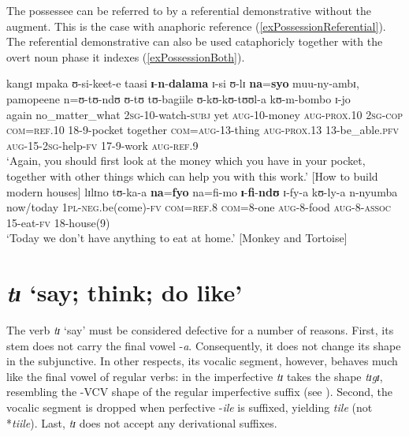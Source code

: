 The possessee can be referred to by a referential demonstrative without the augment. This is the case with anaphoric reference (\ref{exPossessionReferential}). The referential demonstrative can also be used cataphoricly together with the overt noun phase it indexes (\ref{exPossessionBoth}).
\begin{exe}
\ex \label{exPossessionReferential}\gll kangɪ mpaka ʊ-si-keet-e taasi \textbf{ɪ}-\textbf{n}-\textbf{dalama} ɪ-si ʊ-lɪ \textbf{na}=\textbf{syo} muu-ny-ambɪ, pamopeene n=ʊ-tʊ-ndʊ ʊ-tʊ tʊ-bagiile ʊ-kʊ-kʊ-tʊʊl-a kʊ-m-bombo ɪ-jo\\
again no\_matter\_what \textsc{2sg}-10-watch-\textsc{subj} yet \textsc{aug}-10-money \textsc{aug}-\textsc{prox.10} \textsc{2sg}-\textsc{cop} \textsc{com}=\textsc{ref.10} 18-9-pocket together \textsc{com}=\textsc{aug}-13-thing \textsc{aug}-\textsc{prox.13} 13-be\_able.\textsc{pfv} \textsc{aug}-15-\textsc{2sg}-help-\textsc{fv} 17-9-work \textsc{aug}-\textsc{ref.9}\\
\glt `Again, you should first look at the money which you have in your pocket, together with other things which can help you with this work.' [How to build modern houses]
\ex\label{exPossessionBoth} \gll lɪlɪno tʊ-ka-a \textbf{na}=\textbf{fyo} na=fi-mo \textbf{ɪ}-\textbf{fi}-\textbf{ndʊ} ɪ-fy-a kʊ-ly-a n-nyumba\\
now/today \textsc{1pl}-\textsc{neg}.be(come)-\textsc{fv} \textsc{com}=\textsc{ref.8} \textsc{com}=8-one \textsc{aug}-8-food \textsc{aug}-8-\textsc{assoc} 15-eat-\textsc{fv} 18-house(9)\\
\glt `Today we don't have anything to eat at home.' [Monkey and Tortoise]
\end{exe} 
\section{\textit{tɪ} `say; think; do like'}\label{defectiveti} 
The verb \textit{tɪ} \lq say' must be considered defective for a number of reasons. First, its stem does not carry the final vowel -\textit{a}. Consequently, it does not change its shape in the subjunctive. In other respects, its vocalic segment, however, behaves much like the final vowel of regular verbs: in the imperfective \textit{tɪ} takes the shape \textit{tɪgɪ}, resembling the -VCV shape of the regular imperfective suffix (see ). Second, the vocalic segment is dropped when perfective -\textit{ile} is suffixed, yielding \textit{tile} (not *\textit{tiile}). Last, \textit{tɪ} does not accept any derivational suffixes.

